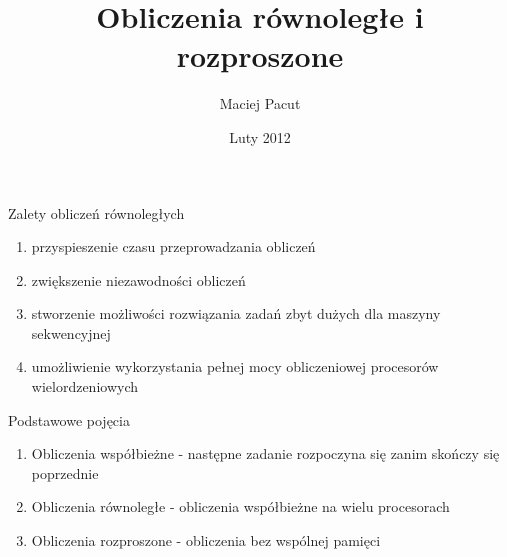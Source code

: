 \documentclass{beamer}
\title{Obliczenia równoległe i rozproszone}
\author{Maciej Pacut}
\date{Luty 2012}
\begin{document}
\maketitle

\begin{frame}{Zalety obliczeń równoległych}
  \begin{enumerate}
    \item przyspieszenie czasu przeprowadzania obliczeń
    \item zwiększenie niezawodności obliczeń
    \item stworzenie możliwości rozwiązania zadań zbyt dużych dla maszyny sekwencyjnej
    \item umożliwienie wykorzystania pełnej mocy obliczeniowej procesorów wielordzeniowych
  \end{enumerate}
\end{frame}

\begin{frame}{Podstawowe pojęcia}
  \begin{enumerate}
    \item Obliczenia współbieżne - następne zadanie rozpoczyna się zanim skończy się poprzednie
    \item Obliczenia równoległe - obliczenia współbieżne na wielu procesorach
    \item Obliczenia rozproszone - obliczenia bez wspólnej pamięci
  \end{enumerate}
\end{frame}
\end{document}
